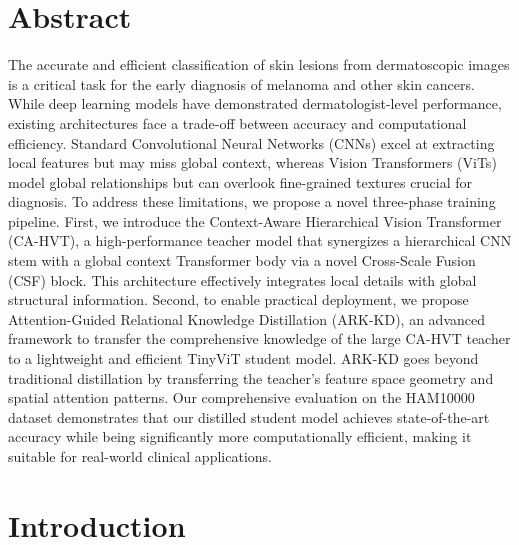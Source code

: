 \section{Abstract}\label{Chapter_1_Motivation}

\noindent The accurate and efficient classification of skin lesions from dermatoscopic images is a critical task for the early diagnosis of melanoma and other skin cancers. While deep learning models have demonstrated dermatologist-level performance, existing architectures face a trade-off between accuracy and computational efficiency. Standard Convolutional Neural Networks (CNNs) excel at extracting local features but may miss global context, whereas Vision Transformers (ViTs) model global relationships but can overlook fine-grained textures crucial for diagnosis. To address these limitations, we propose a novel three-phase training pipeline. First, we introduce the Context-Aware Hierarchical Vision Transformer (CA-HVT), a high-performance teacher model that synergizes a hierarchical CNN stem with a global context Transformer body via a novel Cross-Scale Fusion (CSF) block. This architecture effectively integrates local details with global structural information. Second, to enable practical deployment, we propose Attention-Guided Relational Knowledge Distillation (ARK-KD), an advanced framework to transfer the comprehensive knowledge of the large CA-HVT teacher to a lightweight and efficient TinyViT student model. ARK-KD goes beyond traditional distillation by transferring the teacher's feature space geometry and spatial attention patterns. Our comprehensive evaluation on the HAM10000 dataset demonstrates that our distilled student model achieves state-of-the-art accuracy while being significantly more computationally efficient, making it suitable for real-world clinical applications.

\newpage
\section{Introduction}\label{Chapter_1_Motivation}

